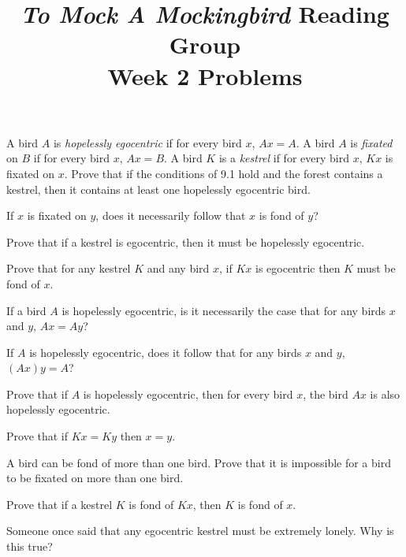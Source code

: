 \documentclass[12pt, letterpaper]{article}
\title{\emph{To Mock A Mockingbird} Reading Group\\Week 2 Problems}
\begin{document}
\maketitle

\disclaimer

\begin{prob}{9.9}
A bird $A$ is \emph{hopelessly egocentric} if for every bird $x$, $Ax = A$. A bird $A$ is \emph{fixated} on $B$ if for every bird $x$, $Ax = B$. A bird $K$ is a \emph{kestrel} if for every bird $x$, $Kx$ is fixated on $x$. Prove that if the conditions of 9.1 hold and the forest contains a kestrel, then it contains at least one hopelessly egocentric bird.
\end{prob}

\begin{prob}{9.10}
If $x$ is fixated on $y$, does it necessarily follow that $x$ is fond of $y$?
\end{prob}

\begin{prob}{9.11}
Prove that if a kestrel is egocentric, then it must be hopelessly egocentric.
\end{prob}

\begin{prob}{9.12}
Prove that for any kestrel $K$ and any bird $x$, if $Kx$ is egocentric then $K$ must be fond of $x$.
\end{prob}

\begin{prob}{9.13}
If a bird $A$ is hopelessly egocentric, is it necessarily the case that for any birds $x$ and $y$, $Ax = Ay$?
\end{prob}

\begin{prob}{9.14}
If $A$ is hopelessly egocentric, does it follow that for any birds $x$ and $y$, $(Ax)y = A$?
\end{prob}

\begin{prob}{9.15}
Prove that if $A$ is hopelessly egocentric, then for every bird $x$, the bird $Ax$ is also hopelessly egocentric.
\end{prob}

\begin{prob}{9.16}
Prove that if $Kx = Ky$ then $x = y$.
\end{prob}

\begin{prob}{9.17}
A bird can be fond of more than one bird. Prove that it is impossible for a bird to be fixated on more than one bird.
\end{prob}

\begin{prob}{9.18}
Prove that if a kestrel $K$ is fond of $Kx$, then $K$ is fond of $x$.
\end{prob}

\begin{prob}{9.19}
Someone once said that any egocentric kestrel must be extremely lonely. Why is this true?
\end{prob}
\end{document}
